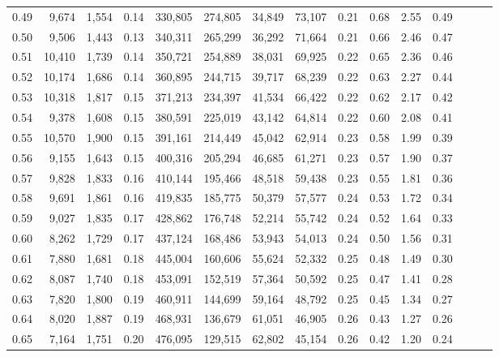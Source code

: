 \begin{tabular}{rrrrrrrrrrrrrrr}
0.49 &   9,674 &  1,554 &  0.14 &  330,805 &  274,805 &   34,849 &   73,107 &  0.21 &  0.68 &  2.55 &      0.49 \\
0.50 &   9,506 &  1,443 &  0.13 &  340,311 &  265,299 &   36,292 &   71,664 &  0.21 &  0.66 &  2.46 &      0.47 \\
0.51 &  10,410 &  1,739 &  0.14 &  350,721 &  254,889 &   38,031 &   69,925 &  0.22 &  0.65 &  2.36 &      0.46 \\
0.52 &  10,174 &  1,686 &  0.14 &  360,895 &  244,715 &   39,717 &   68,239 &  0.22 &  0.63 &  2.27 &      0.44 \\
0.53 &  10,318 &  1,817 &  0.15 &  371,213 &  234,397 &   41,534 &   66,422 &  0.22 &  0.62 &  2.17 &      0.42 \\
0.54 &   9,378 &  1,608 &  0.15 &  380,591 &  225,019 &   43,142 &   64,814 &  0.22 &  0.60 &  2.08 &      0.41 \\
0.55 &  10,570 &  1,900 &  0.15 &  391,161 &  214,449 &   45,042 &   62,914 &  0.23 &  0.58 &  1.99 &      0.39 \\
0.56 &   9,155 &  1,643 &  0.15 &  400,316 &  205,294 &   46,685 &   61,271 &  0.23 &  0.57 &  1.90 &      0.37 \\
0.57 &   9,828 &  1,833 &  0.16 &  410,144 &  195,466 &   48,518 &   59,438 &  0.23 &  0.55 &  1.81 &      0.36 \\
0.58 &   9,691 &  1,861 &  0.16 &  419,835 &  185,775 &   50,379 &   57,577 &  0.24 &  0.53 &  1.72 &      0.34 \\
0.59 &   9,027 &  1,835 &  0.17 &  428,862 &  176,748 &   52,214 &   55,742 &  0.24 &  0.52 &  1.64 &      0.33 \\
0.60 &   8,262 &  1,729 &  0.17 &  437,124 &  168,486 &   53,943 &   54,013 &  0.24 &  0.50 &  1.56 &      0.31 \\
0.61 &   7,880 &  1,681 &  0.18 &  445,004 &  160,606 &   55,624 &   52,332 &  0.25 &  0.48 &  1.49 &      0.30 \\
0.62 &   8,087 &  1,740 &  0.18 &  453,091 &  152,519 &   57,364 &   50,592 &  0.25 &  0.47 &  1.41 &      0.28 \\
0.63 &   7,820 &  1,800 &  0.19 &  460,911 &  144,699 &   59,164 &   48,792 &  0.25 &  0.45 &  1.34 &      0.27 \\
0.64 &   8,020 &  1,887 &  0.19 &  468,931 &  136,679 &   61,051 &   46,905 &  0.26 &  0.43 &  1.27 &      0.26 \\
0.65 &   7,164 &  1,751 &  0.20 &  476,095 &  129,515 &   62,802 &   45,154 &  0.26 &  0.42 &  1.20 &      0.24 \\

\end{tabular}

